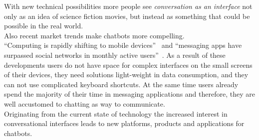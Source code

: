 With new technical possibilities more people see \emph{conversation as an interface} not only as an idea of science fiction movies,
but instead as something that could be possible in the real world.
\\

Also recent market trends make chatbots more compelling.
\\
``Computing is rapidly shifting to mobile devices''~\cite{mobileusage} and ``messaging apps have surpassed social networks in monthly active users''~\cite{convtrends}.
As a result of these developments users do not have space for complex interfaces on the small screens of their devices,
they need solutions light-weight in data consumption, and they can not use complicated keyboard shortcuts.
At the same time users already spend the majority of their time in messaging applications
and therefore, they are well accustomed to chatting as way to communicate.
\\

Originating from the current state of technology the increased interest in conversational interfaces leads to new platforms, products and applications for chatbots.
